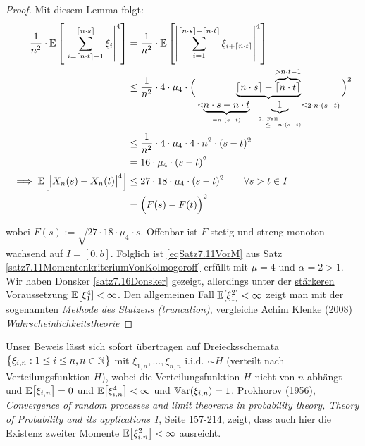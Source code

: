 \begin{proof}
	Mit diesem Lemma folgt:
	\begin{align*}
		\frac{1}{n^2}\cdot\mathbb{E}\left[\left|\sum\limits_{i=\lceil n\cdot t\rceil+1}^{\lceil n\cdot s\rceil}\xi_i\right|^4\right]
		&=
		\frac{1}{n^2}\cdot\mathbb{E}\left[\left|\sum\limits_{i=1}^{\lceil n\cdot s\rceil-\lceil n\cdot t\rceil}\xi_{i+\lceil n\cdot t\rceil}\right|^4\right]\\
		&\leq
		\frac{1}{n^2}\cdot 4\cdot\mu_4\cdot\Big(\underbrace{\lceil n\cdot s\rceil-\overbrace{\lceil n\cdot t\rceil}^{>n\cdot t-1}}_{\leq\underbrace{ n\cdot s-n\cdot t}_{=n\cdot(s-t)}+\underbrace{1}_{\stackrel{\text{2. Fall}}{\leq}n\cdot(s-t)}\leq2\cdot n\cdot(s-t)}\Big)^2\\
		&\leq
		\frac{1}{n^2}\cdot 4\cdot\mu_4\cdot 4\cdot n^2\cdot(s-t)^2\\
		&=16\cdot\mu_4\cdot(s-t)^2\\
		\implies
		\mathbb{E}\Big[\big|X_n(s)-X_n(t)\big|^4\Big]
		&\leq 27\cdot18\cdot\mu_4\cdot(s-t)^2\qquad\forall s>t\in I\\
		&=\Big(F(s)-F(t)\Big)^2
	\end{align*}

	wobei $F(s):=\sqrt{27\cdot18\cdot\mu_4}\cdot s$. 
	Offenbar ist $F$ stetig und streng monoton wachsend auf $I=[0,b]$.
	Folglich ist \eqref{eqSatz7.11VorM} aus Satz \ref{satz7.11MomentenkriteriumVonKolmogoroff} erfüllt mit $\mu=4$ und $\alpha=2>1$.\nl
	Wir haben Donsker \ref{satz7.16Donsker} gezeigt, allerdings unter der \ul{stärkeren} Voraussetzung $\mathbb{E}\big[\xi_1^4]<\infty$. 
	Den allgemeinen Fall $\mathbb{E}[\xi_1^2]<\infty$ zeigt man mit der sogenannten \textit{Methode des Stutzens (truncation)}, 
	vergleiche Achim Klenke (2008) \textit{Wahrscheinlichkeitstheorie}
\end{proof}


\setcounter{satz}{15}
\begin{bemerkungnr}\label{bemerkung7.16Einhalb} %
	Unser Beweis lässt sich sofort übertragen auf Dreiecksschemata\\ 
	$\big\lbrace\xi_{i,n}:1\leq i\leq n,n\in\mathbb{N}\big\rbrace$ mit $\xi_{1,n},\ldots,\xi_{n,n}$ i.i.d. $\sim H$ (verteilt nach Verteilungsfunktion $H$), 
	wobei die Verteilungsfunktion $H$ nicht von $n$ abhängt und $\mathbb{E}\big[\xi_{i,n}\big]=0$ und $\mathbb{E}\big[\xi_{i,n}^4\big]<\infty$ und $\mathbb{V}\text{ar}(\xi_{i,n})=1$. \nl
	Prokhorov (1956), \textit{Convergence of random processes and limit theorems in probability theory, Theory of Probability and its applications 1},
	Seite 157-214, zeigt, dass auch hier die Existenz zweiter Momente $\mathbb{E}\big[\xi_{i,n}^2\big]<\infty$ ausreicht.
\end{bemerkungnr}

